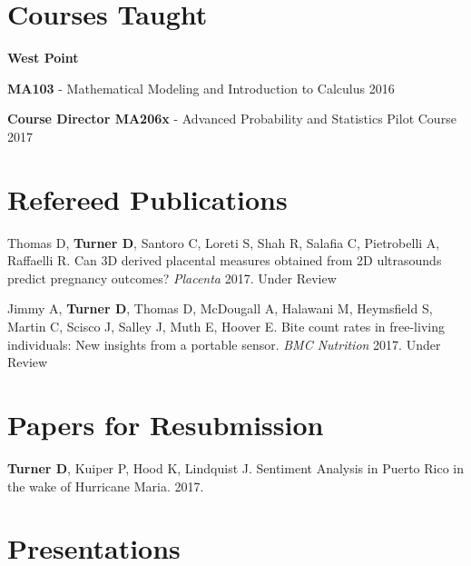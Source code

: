 \documentclass[11pt,]{article}
\providecommand{\tightlist}{%
  \setlength{\itemsep}{0pt}\setlength{\parskip}{0pt}}
\renewenvironment{itemize}{
  \begin{list}{}{
    \setlength{\leftmargin}{1.5em}
  }
}{
  \end{list}
}
\begin{document}
\hypertarget{courses-taught}{%
\section{Courses Taught}\label{courses-taught}}

\begin{itemize}
\tightlist
\item
  \textbf{West Point}
\item
  \textbf{MA103} - Mathematical Modeling and Introduction to Calculus
  \hfill 2016
\item
  \textbf{Course Director MA206x} - Advanced Probability and Statistics
  Pilot Course \hfill 2017
\end{itemize}

\hypertarget{refereed-publications}{%
\section{Refereed Publications}\label{refereed-publications}}

\begin{itemize}
\item
  Thomas D, \textbf{Turner D}, Santoro C, Loreti S, Shah R, Salafia C,
  Pietrobelli A, Raffaelli R. Can 3D derived placental measures obtained
  from 2D ultrasounds predict pregnancy outcomes? \emph{Placenta} 2017.
  Under Review
\item
  Jimmy A, \textbf{Turner D}, Thomas D, McDougall A, Halawani M,
  Heymsfield S, Martin C, Scisco J, Salley J, Muth E, Hoover E. Bite
  count rates in free-living individuals: New insights from a portable
  sensor. \emph{BMC Nutrition} 2017. Under Review
\end{itemize}

\hypertarget{papers-for-resubmission}{%
\section{Papers for Resubmission}\label{papers-for-resubmission}}

\begin{itemize}
\tightlist
\item
  \textbf{Turner D}, Kuiper P, Hood K, Lindquist J. Sentiment Analysis
  in Puerto Rico in the wake of Hurricane Maria. 2017.
\end{itemize}

\hypertarget{presentations}{%
\section{Presentations}\label{presentations}}
\end{document}
